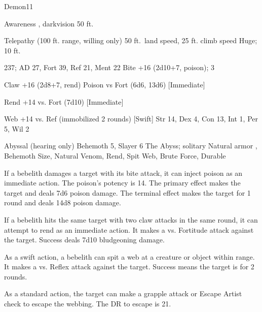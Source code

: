     \begin{monsection}[Bebelith]{Demon}{11}
        \begin{spellcontent}
            \begin{spelltargetinginfo}
                \pari {} Awareness , darkvision 50 ft.
                \par Telepathy (100 ft. range, willing only)
                \pari {} 50 ft.\ land speed, 25 ft. climb speed
                \pari {} Huge;  10 ft.
            \end{spelltargetinginfo}
            \begin{spelleffects}
                \pari {} 237;  AD 27, Fort 39, Ref 21, Ment 22
                \pari {} Bite +16 (2d10+7, poison);  3
                \par Claw +16 (2d8+7, rend)
                \pari {} Poison  vs Fort (6d6, 13d6) [Immediate]
                \par Rend +14 vs. Fort (7d10) [Immediate]
                \par Web +14 vs. Ref (immobilized 2 rounds) [Swift]
                \pari {} Str 14, Dex 4, Con 13, Int 1, Per 5, Wil 2
            \end{spelleffects}
        \end{spellcontent}
        \begin{spellfooter}
            \pari {} Abyssal (hearing only)
            \pari {} Behemoth 5, Slayer 6
            \pari {} The Abyss; solitary
            \pari {} Natural armor , Behemoth Size, Natural Venom, Rend, Spit Web, Brute Force, Durable
        \end{spellfooter}
    \end{monsection}

     If a bebelith damages a target with its bite attack, it can inject poison as an immediate action.
    The poison's potency is 14.
    The primary effect makes the target \sickened and deals 7d6 poison damage.
    The terminal effect makes the target \nauseated for 1 round and deals 14d8 poison damage.

     If a bebelith hits the same target with two claw attacks in the same round, it can attempt to rend as an immediate action.
    It makes a  vs. Fortitude attack against the target.
    Success deals 7d10 bludgeoning damage.

     As a swift action, a bebelith can spit a web at a creature or object within \rngmed range.
    It makes a  vs. Reflex attack against the target.
    Success means the target is \immobilized for 2 rounds.

    As a standard action, the target can make a grapple attack or Escape Artist check to escape the webbing.
    The DR to escape is 21.
